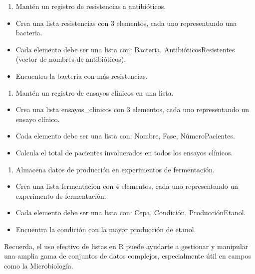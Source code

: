 \documentclass[
]{book}
\providecommand{\tightlist}{%
  \setlength{\itemsep}{0pt}\setlength{\parskip}{0pt}}
\begin{document}
\begin{enumerate}
\def\labelenumi{\arabic{enumi}.}
\setcounter{enumi}{3}
\tightlist
\item
  Mantén un registro de resistencias a antibióticos.
\end{enumerate}

\begin{itemize}
\tightlist
\item
  Crea una lista resistencias con 3 elementos, cada uno representando una bacteria.
\item
  Cada elemento debe ser una lista con: Bacteria, AntibióticosResistentes (vector de nombres de antibióticos).
\item
  Encuentra la bacteria con más resistencias.
\end{itemize}

\begin{enumerate}
\def\labelenumi{\arabic{enumi}.}
\setcounter{enumi}{4}
\tightlist
\item
  Mantén un registro de ensayos clínicos en una lista.
\end{enumerate}

\begin{itemize}
\tightlist
\item
  Crea una lista ensayos\_clinicos con 3 elementos, cada uno representando un ensayo clínico.
\item
  Cada elemento debe ser una lista con: Nombre, Fase, NúmeroPacientes.
\item
  Calcula el total de pacientes involucrados en todos los ensayos clínicos.
\end{itemize}

\begin{enumerate}
\def\labelenumi{\arabic{enumi}.}
\setcounter{enumi}{5}
\tightlist
\item
  Almacena datos de producción en experimentos de fermentación.
\end{enumerate}

\begin{itemize}
\tightlist
\item
  Crea una lista fermentacion con 4 elementos, cada uno representando un experimento de fermentación.
\item
  Cada elemento debe ser una lista con: Cepa, Condición, ProducciónEtanol.
\item
  Encuentra la condición con la mayor producción de etanol.
\end{itemize}

Recuerda, el uso efectivo de listas en R puede ayudarte a gestionar y manipular una amplia gama de conjuntos de datos complejos, especialmente útil en campos como la Microbiología.
\end{document}

